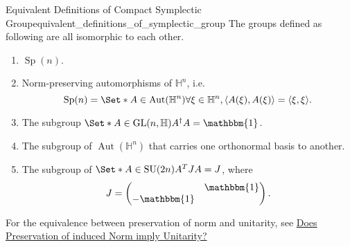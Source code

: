 \documentclass{article}
\begin{document}
\begin{theorem}{Equivalent Definitions of Compact Symplectic Group}{equivalent_definitions_of_symplectic_group}
    The groups defined as following are all isomorphic to each other.
    \begin{enumerate}
        \item $\operatorname{Sp}(n)$.
        \item Norm-preserving automorphisms of $\mathbb{H}^n$, i.e.
        \[ \operatorname{Sp}(n) = \Set*{A\in\operatorname{Aut}(\mathbb{H}^n)}{\forall \xi\in\mathbb{H}^n, \langle A(\xi), A(\xi) \rangle = \langle \xi,\xi \rangle}. \]
        \item The subgroup $\Set*{A\in \operatorname{GL}(n,\mathbb{H})}{A^\dagger A = \mathbbm{1}}$.
        \item The subgroup of $\operatorname{Aut}(\mathbb{H}^n)$ that carries one orthonormal basis to another.
        \item The subgroup of $\Set*{A\in \operatorname{SU}(2n)}{A^T J A = J}$, where
        \[ J = \begin{pmatrix}
            & \mathbbm{1} \\ -\mathbbm{1}
        \end{pmatrix}. \]
    \end{enumerate}
\end{theorem}

For the equivalence between preservation of norm and unitarity, see \href{https://math.stackexchange.com/questions/3313702/does-preservation-of-induced-norm-imply-unitarity}{Does Preservation of induced Norm imply Unitarity?}
\end{document}
